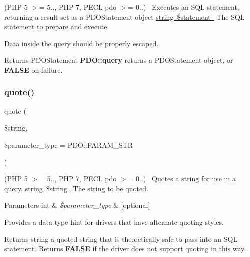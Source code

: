(P\+HP 5 $>$= 5.., P\+HP 7, P\+E\+CL pdo $>$= 0..)~\newline
 Executes an S\+QL statement, returning a result set as a P\+D\+O\+Statement object \mbox{\hyperlink{}{string \$statement }} The S\+QL statement to prepare and execute. 

Data inside the query should be properly escaped. 

\begin{DoxyReturn}{Returns}
P\+D\+O\+Statement {\bfseries P\+D\+O\+::query} returns a P\+D\+O\+Statement object, or {\bfseries F\+A\+L\+SE} on failure. 
\end{DoxyReturn}
\mbox{\label{interface_pes_1_1_database_1_1_handler_1_1_p_d_o_interface_a974d5921d0480c64f94c09994b8c0b48}} 
\subsubsection{\texorpdfstring{quote()}{quote()}}
{\footnotesize\ttfamily quote (\begin{DoxyParamCaption}\item[{}]{\$string,  }\item[{}]{\$parameter\+\_\+type = {\ttfamily PDO\+:\+:PARAM\+\_\+STR} }\end{DoxyParamCaption})}

(P\+HP 5 $>$= 5.., P\+HP 7, P\+E\+CL pdo $>$= 0..)~\newline
 Quotes a string for use in a query. \mbox{\hyperlink{}{string \$string }} The string to be quoted. 


\begin{DoxyParams}[1]{Parameters}
int & {\em \$parameter\+\_\+type} & \mbox{[}optional\mbox{]} \\
\hline
\end{DoxyParams}
Provides a data type hint for drivers that have alternate quoting styles. 

\begin{DoxyReturn}{Returns}
string a quoted string that is theoretically safe to pass into an S\+QL statement. Returns {\bfseries F\+A\+L\+SE} if the driver does not support quoting in this way. 
\end{DoxyReturn}
\mbox{\label{interface_pes_1_1_database_1_1_handler_1_1_p_d_o_interface_aebaea4cae21e0e75ec1489c1648caeb3}} 
